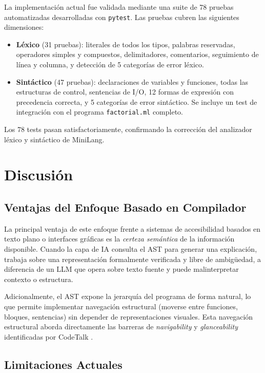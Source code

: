 \documentclass[conference]{IEEEtran}
\begin{document}
La implementación actual fue validada mediante una suite de 78 pruebas automatizadas desarrolladas con \texttt{pytest}. Las pruebas cubren las siguientes dimensiones:

\begin{itemize}
    \item \textbf{Léxico} (31 pruebas): literales de todos los tipos, palabras reservadas, operadores simples y compuestos, delimitadores, comentarios, seguimiento de línea y columna, y detección de 5 categorías de error léxico.
    \item \textbf{Sintáctico} (47 pruebas): declaraciones de variables y funciones, todas las estructuras de control, sentencias de I/O, 12 formas de expresión con precedencia correcta, y 5 categorías de error sintáctico. Se incluye un test de integración con el programa \texttt{factorial.ml} completo.
\end{itemize}

Los 78 tests pasan satisfactoriamente, confirmando la corrección del analizador léxico y sintáctico de MiniLang.

\section{Discusión}

\subsection{Ventajas del Enfoque Basado en Compilador}

La principal ventaja de este enfoque frente a sistemas de accesibilidad basados en texto plano o interfaces gráficas es la \textit{certeza semántica} de la información disponible. Cuando la capa de IA consulta el AST para generar una explicación, trabaja sobre una representación formalmente verificada y libre de ambigüedad, a diferencia de un LLM que opera sobre texto fuente y puede malinterpretar contexto o estructura.

Adicionalmente, el AST expone la jerarquía del programa de forma natural, lo que permite implementar navegación estructural (moverse entre funciones, bloques, sentencias) sin depender de representaciones visuales. Esta navegación estructural aborda directamente las barreras de \textit{navigability} y \textit{glanceability} identificadas por CodeTalk \cite{codetalk}.

\subsection{Limitaciones Actuales}
\end{document}
